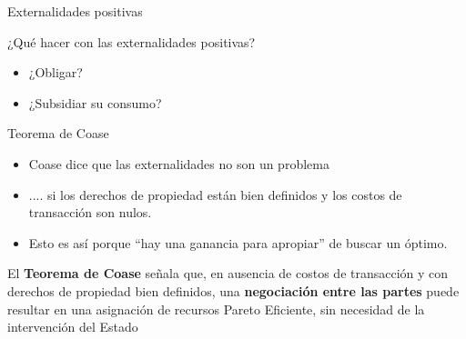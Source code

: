 \documentclass{beamer}
\begin{document}
\begin{frame}{Externalidades positivas}
\begin{figure} [H]
\centering
{}
\end{figure} 
\end{frame}

\begin{frame}{¿Qué hacer con las externalidades positivas?}
    \begin{itemize}
        \item ¿Obligar?
        \item ¿Subsidiar su consumo?
    \end{itemize}
\end{frame}

\begin{frame}{Teorema de Coase}
    \begin{itemize}
        \item Coase dice que las externalidades no son un problema
        \item .... si los derechos de propiedad están bien definidos y los costos de transacción son nulos.
        \item Esto es así porque ``hay una ganancia para apropiar'' de buscar un óptimo.
    \end{itemize}
        \begin{boxB}
        \centering
        El \textbf{Teorema de Coase} señala que, en ausencia de costos de transacción y con derechos de propiedad bien definidos, una \textbf{negociación entre las partes }puede resultar en una asignación de recursos Pareto Eficiente, sin necesidad de la intervención del Estado
        \end{boxB}
\end{frame}
\end{document}
